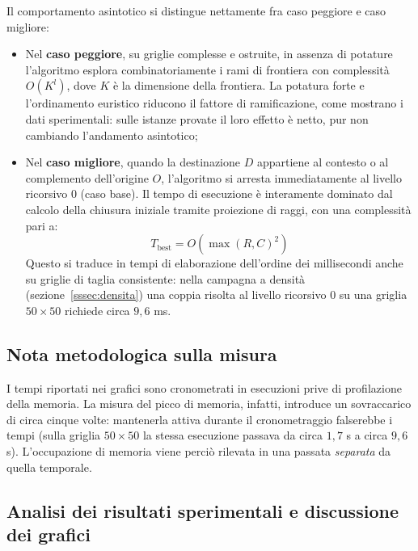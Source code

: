 Il comportamento asintotico si distingue nettamente fra caso peggiore e caso migliore:
\begin{itemize}
    \item Nel \textbf{caso peggiore}, su griglie complesse e ostruite, in assenza di potature l'algoritmo esplora combinatoriamente i rami di frontiera con complessità $O(K^l)$, dove $K$ è la dimensione della frontiera. La potatura forte e l'ordinamento euristico riducono il fattore di ramificazione, come mostrano i dati sperimentali: sulle istanze provate il loro effetto è netto, pur non cambiando l'andamento asintotico;
    \item Nel \textbf{caso migliore}, quando la destinazione $D$ appartiene al contesto o al complemento dell'origine $O$, l'algoritmo si arresta immediatamente al livello ricorsivo $0$ (caso base). Il tempo di esecuzione è interamente dominato dal calcolo della chiusura iniziale tramite proiezione di raggi, con una complessità pari a:
    \begin{equation}
    T_{\text{best}} = O(\max(R, C)^2)
    \label{eq:time_best}
    \end{equation}
    Questo si traduce in tempi di elaborazione dell'ordine dei millisecondi anche su griglie di taglia consistente: nella campagna a densità (sezione~\ref{sssec:densita}) una coppia risolta al livello ricorsivo $0$ su una griglia $50\times50$ richiede circa $9{,}6$ ms.
\end{itemize}

\subsection{Nota metodologica sulla misura}
\label{sec:nota_metodologica_misura}

I tempi riportati nei grafici sono cronometrati in esecuzioni prive di profilazione della memoria. La misura del picco di memoria, infatti, introduce un sovraccarico di circa cinque volte: mantenerla attiva durante il cronometraggio falserebbe i tempi (sulla griglia $50\times50$ la stessa esecuzione passava da circa $1{,}7$ s a circa $9{,}6$ s). L'occupazione di memoria viene perciò rilevata in una passata \textit{separata} da quella temporale.

\subsection{Analisi dei risultati sperimentali e discussione dei grafici}
\label{sec:analisi_risultati}

